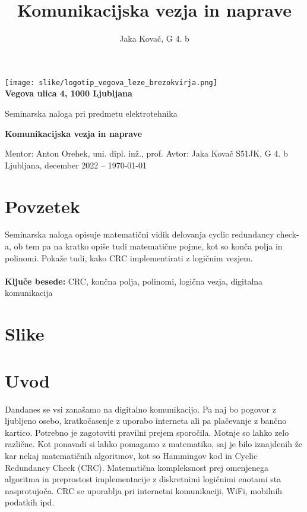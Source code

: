 \documentclass[12pt]{article}
\title{Komunikacijska vezja in naprave}
\author{Jaka Kovač, G 4. b}
\begin{document}

\begin{center}
    \thispagestyle{empty}
    \texttt{[image: slike/logotip\_vegova\_leze\_brezokvirja.png]}
    \\
    \textbf{Vegova ulica 4, 1000 Ljubljana}

    \vspace{\fill} 
    Seminarska naloga pri predmetu elektrotehnika

    \Huge{\textbf{Komunikacijska vezja in naprave}}

    \normalsize
    \vspace{\fill}

    Mentor: Anton Orehek, uni. dipl. inž., prof. \hfill Avtor: Jaka Kovač S51JK,
    G 4. b\\
    Ljubljana, december 2022 – \MMYYYYdate\today
\end{center}
\newpage
\thispagestyle{empty}
\null
\newpage
\thispagestyle{empty}

\section*{Povzetek}
Seminarska naloga opisuje matematični vidik delovanja cyclic redundancy check-a,
ob tem pa na kratko opiše tudi matematične pojme, kot so konča polja in polinomi.
Pokaže tudi, kako CRC implementirati z logičnim vezjem.\\
\\
\textbf{Ključe besede:} CRC, končna polja, polinomi, logična vezja, digitalna
komunikacija\\

\vfill

\vfill
\newpage
\thispagestyle{empty}
\tableofcontents

\begingroup

\makeatletter
\section*{Slike}
\let\clearpage\relax
\makeatother
\endgroup
\thispagestyle{empty}


\newpage
\section{Uvod}
Dandanes se vsi zanašamo na digitalno komunikacijo. Pa naj bo pogovor z ljubljeno
osebo, kratkočasenje z uporabo interneta ali pa plačevanje z bančno kartico. 
Potrebno je zagotoviti pravilni prejem sporočila. Motnje so lahko zelo različne.
Kot ponavadi si lahko pomagamo z matematiko, saj je bilo iznajdenih že kar nekaj
matematičnih algoritmov, kot so Hammingov kod in Cyclic Redundancy Check (CRC). 
Matematična kompleksnost prej omenjenega algoritma in preprostost
implementacije z diskretnimi logičnimi enotami sta nasprotujoča. CRC se
uporablja pri internetni komunikaciji, WiFi, mobilnih podatkih ipd.
\end{document}
